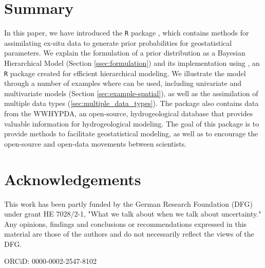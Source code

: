 \section{Summary}

In this paper, we have introduced the \texttt{R} package , which contains methods for assimilating ex-situ data to generate prior probabilities for geostatistical parameters. 
We explain the formulation of a prior distribution as a Bayesian Hierarchical Model (Section \ref{ssec:formulation}) and its implementation using , an \texttt{R} package created for efficient hierarchical modeling. 
We illustrate the model through a number of examples where  can be used, including univariate and multivariate models (Section \ref{sec:example-spatial}), as well as the assimilation of multiple data types (\ref{sec:multiple_data_types}). 
The package also contains data from the WWHYPDA, an open-source, hydrogeological database that provides valuable information for hydrogeological modeling. 
The goal of this package is to provide methods to facilitate geostatistical modeling, as well as to encourage the open-source and open-data movements between scientists.


\section{Acknowledgements}
This work has been partly funded by the German Research Foundation (DFG) under grant HE 7028/2-1, "What we talk about when we talk about uncertainty." 
Any opinions, findings and conclusions or recommendations expressed in this material are those of the authors and do not necessarily reflect the views of the DFG.




\address{Falk He{\ss}e\\
  Institute of Earth and Environmental Sciences\\
  University Potsdam\\
  Potsdam, Germany\\}
  ORCiD: 0000-0002-2547-8102\\

\address{Karina Cucchi\\
  Department of Civil and Environmental Engineering\\
  University of California, Berkeley\\
  Berkeley, CA, USA\\}

